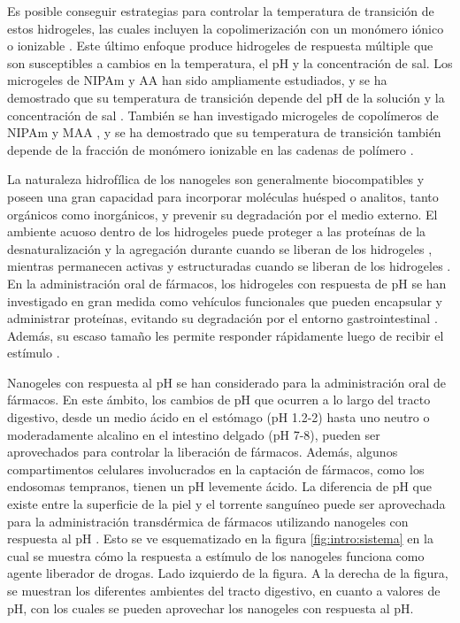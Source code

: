 Es posible conseguir estrategias para controlar la temperatura de transici\'on de estos hidrogeles, las cuales incluyen la copolimerizaci\'on con un mon\'omero i\'onico o ionizable \cite{Cai2007,Macchione2019, Hirose1987,Lopez2020}.
Este \'ultimo enfoque produce hidrogeles de respuesta m\'ultiple que son susceptibles a cambios en la temperatura, el pH y la concentraci\'on de sal.
Los microgeles de NIPAm y AA han sido ampliamente estudiados, y se ha demostrado que su temperatura de transici\'on depende del pH de la soluci\'on y la concentraci\'on de sal \cite{Morris1997, Jones2000,Bradley2005,Begum2016}.
Tambi\'en se han investigado microgeles de copol\'imeros de NIPAm y MAA \cite{Dowding2000,Hoare2004,Giussi2015}, y se ha demostrado que su temperatura de transici\'on tambi\'en depende de la fracci\'on de mon\'omero ionizable en las cadenas de pol\'imero \cite{Morris1997,Jones2000, Hoare2004, Bradley2005, Lee2008,Wong2009,Hamzavi2016}.


La naturaleza hidrof\'ilica de los nanogeles son generalmente biocompatibles y poseen una gran capacidad para incorporar mol\'eculas hu\'esped o analitos, tanto org\'anicos como inorg\'anicos, y prevenir su degradaci\'on por el medio externo.
El ambiente acuoso dentro de los hidrogeles puede proteger a las prote\'inas de la desnaturalizaci\'on y la agregaci\'on durante cuando se liberan de los hidrogeles \cite{asayama2008comparison,sawada2010nano,beierle2014polymer}, mientras permanecen activas y estructuradas cuando se liberan de los hidrogeles \cite{vermonden2012hydrogels}.
En la administraci\'on oral de f\'armacos, los hidrogeles con respuesta de pH se han investigado en gran medida como veh\'iculos funcionales que pueden encapsular y administrar prote\'inas, evitando su degradaci\'on por el entorno gastrointestinal \cite{malmsten2010biomacromolecules,renukuntla2013approaches,koetting2014ph}.
Adem\'as, su escaso tama\~no les permite responder r\'apidamente luego de recibir el est\'imulo \cite{tanaka1979kinetics}.



Nanogeles con respuesta al pH se han considerado para la administraci\'on oral de f\'armacos. En este \'ambito, los cambios de pH que ocurren a lo largo del tracto digestivo, desde un medio \'acido en el est\'omago (pH 1.2-2) hasta uno neutro o moderadamente alcalino en el intestino delgado (pH 7-8), pueden ser aprovechados para controlar la liberaci\'on de f\'armacos.
Adem\'as, algunos compartimentos celulares involucrados en la captaci\'on de f\'armacos, como los endosomas tempranos, tienen un pH levemente \'acido. La diferencia de pH que existe entre la superficie de la piel y el torrente sangu\'ineo puede ser aprovechada para la administraci\'on transd\'ermica de f\'armacos utilizando nanogeles con respuesta al pH \cite{qindeel2019development}.
Esto se ve esquematizado en la figura \ref{fig:intro:sistema} en la cual se muestra c\'omo la respuesta a est\'imulo de los nanogeles funciona como agente liberador de drogas. Lado izquierdo de la figura.
A la derecha de la figura, se muestran los diferentes ambientes del tracto digestivo, en cuanto a valores de pH, con los cuales se pueden aprovechar los nanogeles con respuesta al pH.


